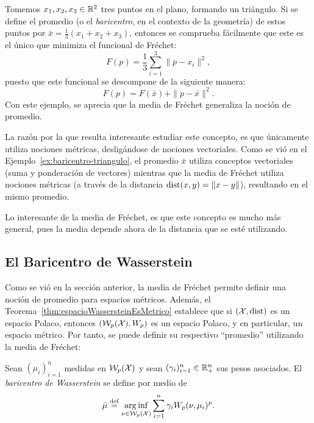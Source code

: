 \begin{example}\label{ex:baricentro-triangulo}
    Tomemos $x_1, x_2, x_3 \in \R^2$ tres puntos en el plano, formando un triángulo. Si se define el promedio (o el \textit{baricentro}, en el contexto de la geometría) de estos puntos por $\bar x = \frac{1}{3} (x_1 + x_2 + x_3)$, entonces se comprueba fácilmente que este es el único que minimiza el funcional de Fréchet:
    \begin{equation}
        F(p) = \frac{1}{3} \sum_{i=1}^{3} \|p - x_i\|^2,
    \end{equation}
    puesto que este funcional se descompone de la siguiente manera:
    \begin{equation}
        F(p) = F(\bar x) + \|p-\bar x\|^2.
    \end{equation}
    Con este ejemplo, se aprecia que la media de Fréchet generaliza la noción de promedio.
\end{example}

La razón por la que resulta interesante estudiar este concepto, es que únicamente utiliza nociones métricas, desligándose de nociones vectoriales. Como se vió en el Ejemplo~\ref{ex:baricentro-triangulo}, el promedio $\bar x$ utiliza conceptos vectoriales (suma y ponderación de vectores) mientras que la media de Fréchet utiliza nociones métricas (a través de la distancia $\dist(x, y) = \|x - y\|$), resultando en el mismo promedio.

Lo interesante de la media de Fréchet, es que este concepto es mucho más general, pues la media depende ahora de la distancia que se esté utilizando.


\subsection{El Baricentro de Wasserstein}\label{ssec:el-baricentro-de-Wasserstein}  %

Como se vió en la sección anterior, la media de Fréchet permite definir una noción de promedio para espacios métricos. Además, el Teorema~\ref{thm:espacioWassersteinEsMetrico} establece que si $(\cX, \dist)$ es un espacio Polaco, entonces $(\WassersteinSpace[p]{\cX}, W_p)$ es un espacio Polaco, y en particular, un espacio métrico. Por tanto, se puede definir su respectivo ``promedio'' utilizando la media de Fréchet:


\begin{definition}\label{def:baricentroWasserstein}
    Sean $(\mu_{i})_{i=1}^{n}$ medidas en $\WassersteinSpace[p]{\cX} $ y sean $(\gamma_{i})_{i=1}^{n} \in \R_+^n$ sus pesos asociados. El \emph{baricentro de Wasserstein} se define por medio de
    \begin{equation}
        \bar \mu \eqdef \arginf_{\nu \in \WassersteinSpace[p]{\cX} } \sum_{i=1}^{n} \gamma_i \Wasserstein[p]{\nu}{\mu_i}^p.
    \end{equation}

\end{definition}

